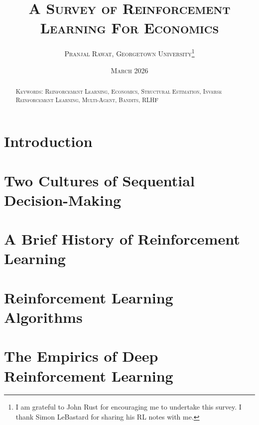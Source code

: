\documentclass[11pt,notitlepage,a4paper]{article}
\begin{document}
\begin{titlepage}
\title{\textsc{A Survey of Reinforcement Learning For Economics}}
\author{
\textsc{Pranjal Rawat, Georgetown University}\thanks{I am grateful to John Rust for encouraging me to undertake this survey. I thank Simon LeBastard for sharing his RL notes with me.}\\
}
\date{\textsc{March 2026}}

\maketitle
\thispagestyle{empty}


\begin{abstract}
\noindent

\bigskip

\noindent \textsc{Keywords: Reinforcement Learning, Economics, Structural Estimation, Inverse Reinforcement Learning, Multi-Agent, Bandits, RLHF}

\end{abstract}

\end{titlepage}

\newpage
\tableofcontents
\newpage

\section{Introduction}
\label{section:intro}


\section{Two Cultures of Sequential Decision-Making}
\label{section:language}


\section{A Brief History of Reinforcement Learning}
\label{section:history}


\section{Reinforcement Learning Algorithms}
\label{section:rl_algorithms}




\section{The Empirics of Deep Reinforcement Learning}
\label{section:deeprl_practice}

\end{document}
